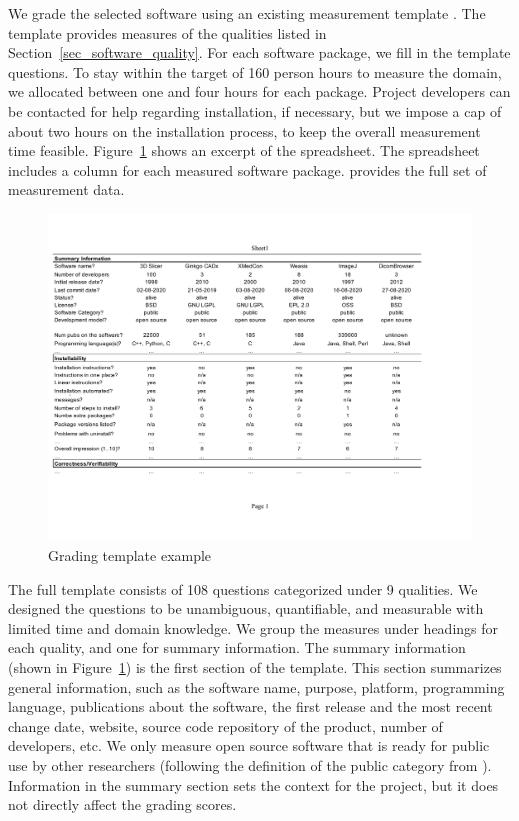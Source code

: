 \documentclass[11pt]{article}
\begin{document}
We grade the selected software using an existing measurement template
\cite{SmithEtAl2021}.  The template provides measures of the qualities listed in
Section~\ref{sec_software_quality}.  For each software package, we fill in the
template questions. To stay within the target of 160 person hours to measure the
domain, we allocated between one and four hours for each package. Project
developers can be contacted for help regarding installation, if necessary, but
we impose a cap of about two hours on the installation process, to keep the
overall measurement time feasible.  Figure~\ref{fg_grading_template_example}
shows an excerpt of the spreadsheet.  The spreadsheet includes a column for each
measured software package. \cite{Dong2021-Data} provides the full set of
measurement data.

\begin{figure}[!ht]
\includegraphics[scale=0.66]{template.pdf}
\caption{Grading template example}
\label{fg_grading_template_example}
\end{figure}

The full template consists of 108 questions categorized under 9 qualities.  We
designed the questions to be unambiguous, quantifiable, and measurable with
limited time and domain knowledge. We group the measures under headings for each
quality, and one for summary information. The summary information (shown in
Figure~\ref{fg_grading_template_example}) is the first section of the template.
This section summarizes general information, such as the software name, purpose,
platform, programming language, publications about the software, the first
release and the most recent change date, website, source code repository of the
product, number of developers, etc.  We only measure open source software that
is ready for public use by other researchers (following the definition of the
public category from \cite{GewaltigAndCannon2012}). Information in the summary
section sets the context for the project, but it does not directly affect the
grading scores.
\end{document}
